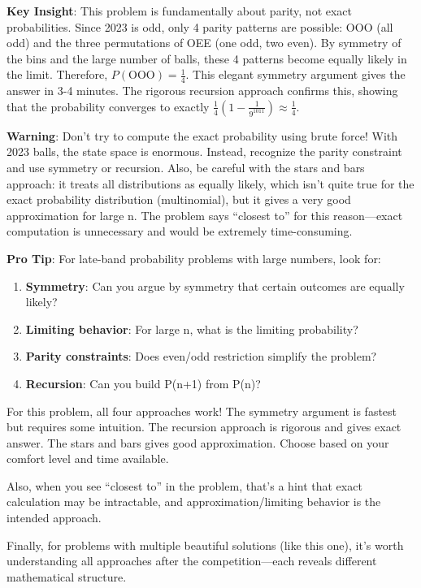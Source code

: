 \documentclass[12pt]{article}
\begin{document}
\begin{keyinsightbox}
\textbf{Key Insight}: This problem is fundamentally about parity, not exact probabilities. Since 2023 is odd, only 4 parity patterns are possible: OOO (all odd) and the three permutations of OEE (one odd, two even). By symmetry of the bins and the large number of balls, these 4 patterns become equally likely in the limit. Therefore, $P(\text{OOO}) = \frac{1}{4}$. This elegant symmetry argument gives the answer in 3-4 minutes. The rigorous recursion approach confirms this, showing that the probability converges to exactly $\frac{1}{4}(1 - \frac{1}{9^{1011}}) \approx \frac{1}{4}$.
\end{keyinsightbox}

\begin{warningbox}
\textbf{Warning}: Don't try to compute the exact probability using brute force! With 2023 balls, the state space is enormous. Instead, recognize the parity constraint and use symmetry or recursion. Also, be careful with the stars and bars approach: it treats all distributions as equally likely, which isn't quite true for the exact probability distribution (multinomial), but it gives a very good approximation for large n. The problem says ``closest to'' for this reason—exact computation is unnecessary and would be extremely time-consuming.
\end{warningbox}

\begin{tipbox}
\textbf{Pro Tip}: For late-band probability problems with large numbers, look for:
\begin{enumerate}
    \item \textbf{Symmetry}: Can you argue by symmetry that certain outcomes are equally likely?
    \item \textbf{Limiting behavior}: For large n, what is the limiting probability?
    \item \textbf{Parity constraints}: Does even/odd restriction simplify the problem?
    \item \textbf{Recursion}: Can you build P(n+1) from P(n)?
\end{enumerate}

For this problem, all four approaches work! The symmetry argument is fastest but requires some intuition. The recursion approach is rigorous and gives exact answer. The stars and bars gives good approximation. Choose based on your comfort level and time available.

Also, when you see ``closest to'' in the problem, that's a hint that exact calculation may be intractable, and approximation/limiting behavior is the intended approach.

Finally, for problems with multiple beautiful solutions (like this one), it's worth understanding all approaches after the competition—each reveals different mathematical structure.
\end{tipbox}
\end{document}

